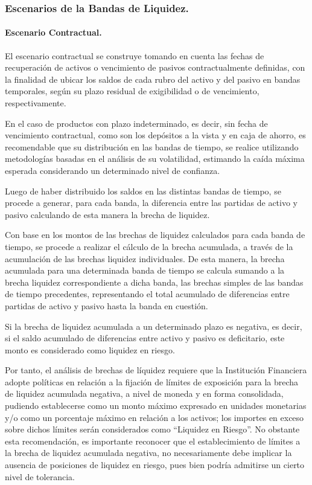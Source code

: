 \documentclass[]{article}
\begin{document}
\hypertarget{escenarios-de-la-bandas-de-liquidez.}{%
\subsubsection{Escenarios de la Bandas de
Liquidez.}\label{escenarios-de-la-bandas-de-liquidez.}}

\hypertarget{escenario-contractual.}{%
\paragraph{Escenario Contractual.}\label{escenario-contractual.}}

El escenario contractual se construye tomando en cuenta las fechas de
recuperación de activos o vencimiento de pasivos contractualmente
definidas, con la finalidad de ubicar los saldos de cada rubro del
activo y del pasivo en bandas temporales, según su plazo residual de
exigibilidad o de vencimiento, respectivamente.

En el caso de productos con plazo indeterminado, es decir, sin fecha de
vencimiento contractual, como son los depósitos a la vista y en caja de
ahorro, es recomendable que su distribución en las bandas de tiempo, se
realice utilizando metodologías basadas en el análisis de su
volatilidad, estimando la caída máxima esperada considerando un
determinado nivel de confianza.

Luego de haber distribuido los saldos en las distintas bandas de tiempo,
se procede a generar, para cada banda, la diferencia entre las partidas
de activo y pasivo calculando de esta manera la brecha de liquidez.

Con base en los montos de las brechas de liquidez calculados para cada
banda de tiempo, se procede a realizar el cálculo de la brecha
acumulada, a través de la acumulación de las brechas liquidez
individuales. De esta manera, la brecha acumulada para una determinada
banda de tiempo se calcula sumando a la brecha liquidez correspondiente
a dicha banda, las brechas simples de las bandas de tiempo precedentes,
representando el total acumulado de diferencias entre partidas de activo
y pasivo hasta la banda en cuestión.

Si la brecha de liquidez acumulada a un determinado plazo es negativa,
es decir, si el saldo acumulado de diferencias entre activo y pasivo es
deficitario, este monto es considerado como liquidez en riesgo.

Por tanto, el análisis de brechas de líquidez requiere que la
Institución Financiera adopte políticas en relación a la fijación de
límites de exposición para la brecha de liquidez acumulada negativa, a
nivel de moneda y en forma consolidada, pudiendo establecerse como un
monto máximo expresado en unidades monetarias y/o como un porcentaje
máximo en relación a los activos; los importes en exceso sobre dichos
límites serán considerados como ``Liquidez en Riesgo''. No obstante esta
recomendación, es importante reconocer que el establecimiento de límites
a la brecha de liquidez acumulada negativa, no necesariamente debe
implicar la ausencia de posiciones de liquidez en riesgo, pues bien
podría admitirse un cierto nivel de tolerancia.
\end{document}
